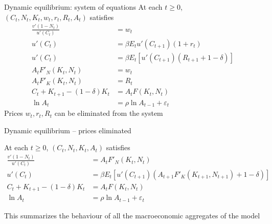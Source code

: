 \documentclass{beamer}
\begin{document}
\begin{frame}{Dynamic equilibrium: system of equations}
At each $t\geq 0$, $(C_t,N_t, K_{t},w_t,r_t,R_t,A_t)$
satisfies
\begin{align*}
\frac{v'(1-N_t)}{u'(C_t)}&= w_t \nonumber\\
u'(C_t) &= \beta E_t u'(C_{t+1})(1+r_t) \\
u'(C_t) &= \beta E_t [u'(C_{t+1})(R_{t+1}+1-\delta)] \\
 A_t F'_N(K_t,N_t) &= w_t \nonumber\\
 A_t F'_K(K_t,N_t) &= R_t \nonumber\\
C_t+K_{t+1}-(1-\delta)K_{t} &= A_t F(K_t,N_t) \nonumber \\
\ln A_t &= \rho \ln A_{t-1} + \varepsilon_t
\end{align*}
Prices $w_t, r_t, R_t$ can be eliminated from the system
\end{frame}
\begin{frame}{Dynamic equilibrium -- prices eliminated}

At each $t\geq 0$, $(C_t,N_t, K_{t}, A_t)$
satisfies
\begin{align*}
\frac{v'(1-N_t)}{u'(C_t)}&= A_t F'_N(K_t,N_t) \nonumber\\
u'(C_t) &= \beta E_t [u'(C_{t+1})(A_{t+1} F'_K(K_{t+1},N_{t+1})+1-\delta)] \\
C_t+K_{t+1}-(1-\delta)K_{t} &= A_t F(K_t,N_t) \nonumber \\
\ln A_t &= \rho \ln A_{t-1} + \varepsilon_t
\end{align*}

This summarizes the behaviour of all the macroeconomic aggregates of the model

\end{frame}
\end{document}
